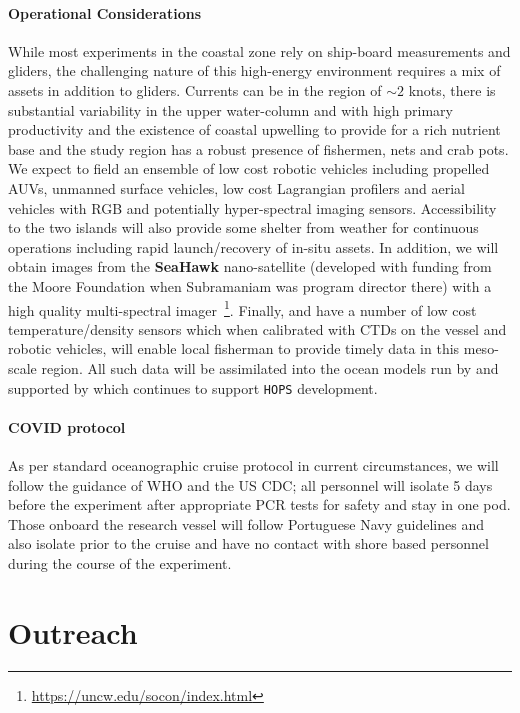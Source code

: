 \paragraph{Operational Considerations} While most experiments in the
coastal zone rely on ship-board measurements and gliders, the
challenging nature of this high-energy environment requires a mix of
assets in addition to gliders. Currents can be in the region of
$\sim 2$ knots, there is substantial variability in the upper
water-column and with high primary productivity and the existence of
coastal upwelling to provide for a rich nutrient base and the study
region has a robust presence of fishermen, nets and crab pots. We
expect to field an ensemble of low cost robotic vehicles including
propelled AUVs, unmanned surface vehicles, low cost Lagrangian
profilers and aerial vehicles with RGB and potentially hyper-spectral
imaging sensors. Accessibility to the two islands will also provide
some shelter from weather for continuous operations including rapid
launch/recovery of in-situ assets. In addition, we will obtain images
from the \textbf{SeaHawk} nano-satellite (developed with funding from
the Moore Foundation when Subramaniam was program director there) with
a high quality multi-spectral
imager~\footnote{\url{https://uncw.edu/socon/index.html}}. Finally,
\univ and \inst have a number of low cost temperature/density sensors
which when calibrated with CTDs on the vessel and robotic vehicles,
will enable local fisherman to provide timely data in this meso-scale
region. All such data will be assimilated into the ocean models run by
\inst and supported by \mit which continues to support \texttt{HOPS}
development.

\paragraph{COVID protocol} As per standard oceanographic cruise
protocol in current circumstances, we will follow the guidance of WHO
and the US CDC; all personnel will isolate 5 days before the
experiment after appropriate PCR tests for safety and stay in one
pod. Those onboard the \inst research vessel will follow Portuguese
Navy guidelines and also isolate prior to the cruise and have no
contact with shore based personnel during the course of the
experiment.

\section*{Outreach}

